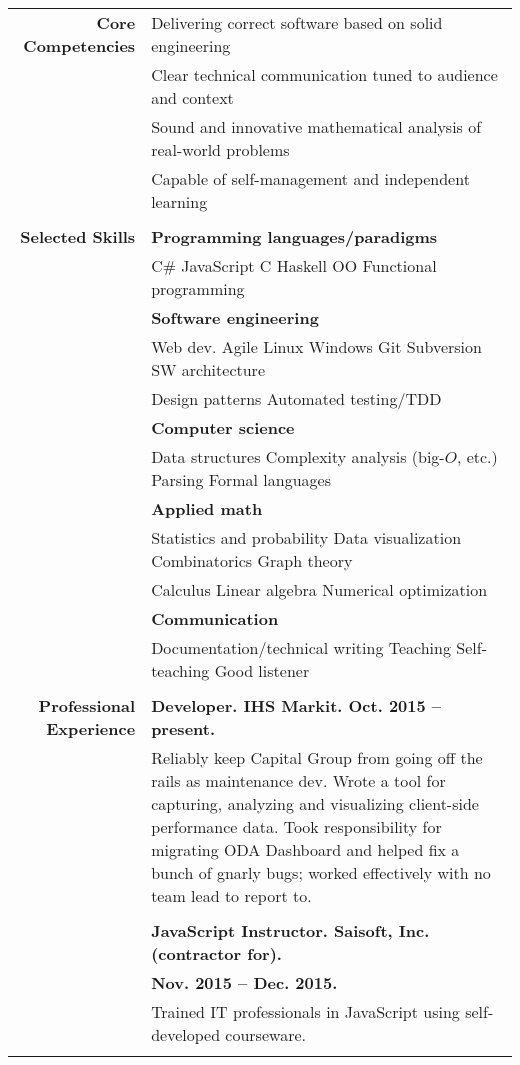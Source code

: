 \documentclass{article}
\newcommand\spc{\hspace{8pt}}
\begin{document}
\bgroup
\begin{tabular}{rl}
  \def\arraystrech{1.5}
  {\bf Core Competencies} & Delivering correct software based on solid engineering \\
   & Clear technical communication tuned to audience and context \\
  & Sound and innovative mathematical analysis of real-world problems \\
  & Capable of self-management and independent learning \\ \\

  {\bf Selected Skills}  & {\bf Programming languages/paradigms} \\
  & C\# \spc JavaScript \spc C \spc Haskell \spc OO \spc Functional programming \\
  & {\bf Software engineering} \\
  & Web dev. \spc Agile \spc Linux \spc Windows \spc Git \spc Subversion \spc SW architecture \\
 & Design patterns \spc Automated testing/TDD \\
    & {\bf Computer science} \\
  & Data structures \spc Complexity analysis (big-$O$, etc.) \spc Parsing \spc Formal languages \\
  & {\bf Applied math} \\
  & Statistics and probability \spc Data visualization \spc Combinatorics \spc Graph theory \\
  & Calculus \spc Linear algebra \spc Numerical optimization \\
  & {\bf Communication} \\
  & Documentation/technical writing \spc Teaching \spc Self-teaching \spc Good listener \\ \\

  {\bf Professional Experience} & {\bf Developer. IHS Markit. Oct. 2015 -- present.} \\
  & \parbox{4.5in}{Reliably keep Capital Group from going off the rails as maintenance dev. Wrote a tool for capturing, analyzing and visualizing client-side performance data. Took responsibility for migrating ODA Dashboard and helped fix a bunch of gnarly bugs; worked effectively with no team lead to report to.} 

  \\ \\

  & {\bf JavaScript Instructor. Saisoft, Inc. (contractor for).} \\ & {\bf Nov. 2015 -- Dec. 2015.} \\
  & \parbox{4.5in}{Trained IT professionals in JavaScript using self-developed courseware.} \\ \\


\end{tabular}
\end{document}

